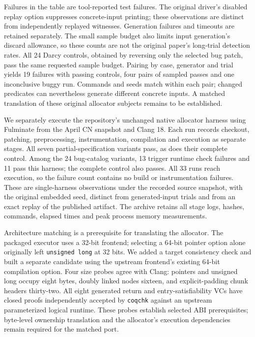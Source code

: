 \begin{center}
\small

\end{center}

Failures in the table are tool-reported test failures. The original driver's
disabled replay option suppresses concrete-input printing; these observations
are distinct from independently replayed witnesses. Generation failures and
timeouts are retained separately. The small sample budget also limits input
generation's discard allowance, so these counts are not the original paper's
long-trial detection rates. All 24 Darcy controls, obtained by reversing only
the selected bug patch, pass the same requested sample budget. Pairing by case,
generator and trial yields 19 failures with passing controls, four pairs of
sampled passes and one inconclusive buggy run. Commands and seeds match within
each pair; changed predicates can nevertheless generate different concrete
inputs. A matched \tespec{} translation of these original
allocator subjects remains to be established.

We separately execute the repository's unchanged native allocator harness using
Fulminate from the April CN snapshot and Clang 18. Each run records checkout,
patching, preprocessing, instrumentation, compilation and execution as separate
stages. All seven partial-specification variants pass, as does their complete
control. Among the 24 bug-catalog variants, 13 trigger runtime check failures
and 11 pass this harness; the complete control also passes. All 33 runs reach
execution, so the failure count contains no build or instrumentation failures.
These are single-harness observations under the recorded source snapshot, with
the original embedded seed, distinct from generated-input trials and from an
exact replay of the published artifact. The archive retains all stage logs,
hashes, commands, elapsed times and peak process memory measurements.

Architecture matching is a prerequisite for translating the allocator. The
packaged executor uses a 32-bit frontend; selecting a 64-bit pointer option
alone originally left \texttt{unsigned long} at 32 bits. We added a target
consistency check and built a separate candidate using the upstream frontend's
existing 64-bit compilation option. Four size probes agree with Clang:
pointers and unsigned long occupy eight bytes, doubly linked nodes sixteen,
and explicit-padding chunk headers thirty-two. All eight generated return and
entry-satisfiability VCs have closed proofs independently accepted by
\texttt{coqchk} against an upstream parameterized logical runtime. These probes
establish selected ABI prerequisites; byte-level ownership translation and
the allocator's execution dependencies remain required for the matched port.

